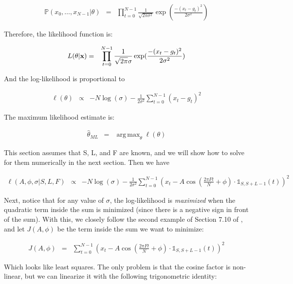 \documentclass[11pt]{article}
\theoremstyle{plain}
\theoremstyle{definition}
\DeclareMathOperator*{\argmax}{arg\,max}
\begin{document}
\begin{eqnarray}
\label{eq:jointpdf}
	\mathbb{P}(x_0, \ldots, x_{N - 1} | \theta) &=& \prod_{t=0}^{N-1} \frac{1}{\sqrt{2 \pi \sigma^2}} \exp(\frac{-(x_t - g_t)^2}{2 \sigma^2})
\end{eqnarray}

\noindent Therefore, the likelihood function is:

\begin{eqnarray}
\label{eq:likelihood}
	L(\theta | {\bf x}) &=& \prod_{t=0}^{N-1} \frac{1}{\sqrt{2 \pi} \sigma} \exp(\frac{-(x_t - g_t)^2}{2 \sigma^2})
\end{eqnarray}

\noindent And the log-likelihood is proportional to

\begin{eqnarray}
\label{eq:loglikelihood}
	\ell(\theta) &\propto& -N \log(\sigma) - \frac{1}{2 \sigma^2} \sum_{t=0}^{N-1} (x_t - g_t)^2
\end{eqnarray}

\noindent The maximum likelihood estimate is:

\begin{eqnarray}
	\hat{\theta}_{ML} &=& \argmax_{\theta} \ell(\theta)
\end{eqnarray}

This section assumes that S, L, and F are known, and we will show how to solve for them numerically in the next section. Then we have

\begin{eqnarray}
	\ell(A, \phi, \sigma | S, L, F) &\propto& -N \log(\sigma) - \frac{1}{2 \sigma^2} \sum_{t=0}^{N-1} (x_t - A \cos(\frac{2 \pi F t}{N} + \phi) \cdot \mathbb{1}_{S, S+L-1}(t))^2
\end{eqnarray}

Next, notice that for any value of $\sigma$, the log-likelihood is {\it maximized} when the quadratic term inside the sum is minimized (since there is a negative sign in front of the sum). With this, we closely follow the second example of Section 7.10 of \cite{kay1993fundamentals}, and let $J(A, \phi)$ be the term inside the sum we want to minimize:

\begin{eqnarray}
	J(A, \phi) &=& \sum_{t=0}^{N-1} (x_{t} - A \cos(\frac{2 \pi F t}{N} + \phi) \cdot \mathbb{1}_{S, S+L-1}(t))^2
\end{eqnarray}

\noindent Which looks like least squares. The only problem is that the cosine factor is non-linear, but we can linearize it with the following trigonometric identity:
\end{document}
